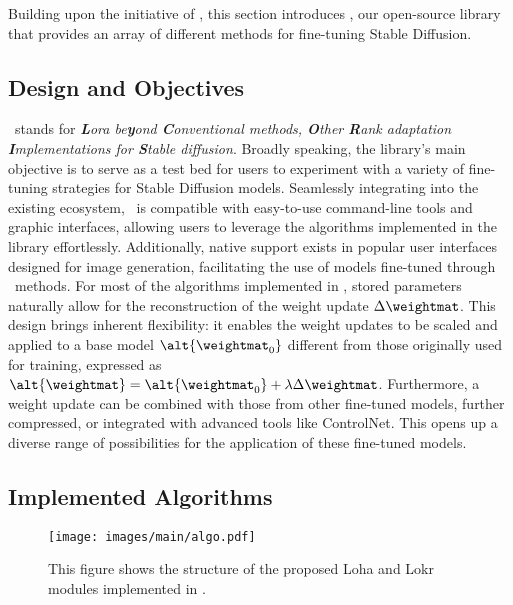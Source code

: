 Building upon the initiative of \lora,
this section introduces \lycoris, our open-source library that provides an array of different methods for fine-tuning Stable Diffusion.

\subsection{Design and Objectives}
\label{subsec:lycoris-design}

\lycoris~stands for \emph{\textbf{L}ora be\textbf{y}ond \textbf{C}onventional methods, \textbf{O}ther \textbf{R}ank adaptation \textbf{I}mplementations for \textbf{S}table diffusion}.
Broadly speaking, the library's main objective is to serve as a test bed for users to experiment with a variety of fine-tuning strategies for Stable Diffusion models. Seamlessly integrating into the existing ecosystem, \lycoris~is compatible with easy-to-use command-line tools and graphic interfaces, allowing users to leverage the algorithms implemented in the library effortlessly. Additionally, native support exists in popular user interfaces designed for image generation, facilitating the use of models fine-tuned through \lycoris~methods.
For most of the algorithms implemented in \lycoris, stored parameters naturally allow for the reconstruction of the weight update $\Delta\weightmat$.
This design brings inherent flexibility: it enables the weight updates to be scaled and applied to a base model $\alt{\weightmat_0}$ different from those originally used for training, expressed as $\alt{\weightmat}=\alt{\weightmat_0}+\lambda\Delta \weightmat$.
Furthermore, a weight update can be combined with those from other fine-tuned models, further compressed, or integrated with advanced tools like ControlNet. This opens up a diverse range of possibilities for the application of these fine-tuned models.
 
 

\subsection{Implemented Algorithms}
\label{subsec:algos}

\begin{figure}[t]
    \centering
    \texttt{[image: images/main/algo.pdf]}
    \caption{This figure shows the structure of the proposed Loha and Lokr modules implemented in \lycoris.}
    \disclose{\vspace*{-0.8em}}{\vspace*{-0.5em}}
    \label{fig:algo-main}
\end{figure}

